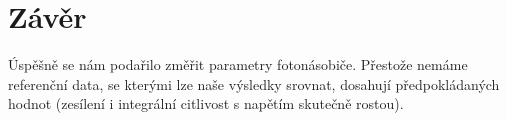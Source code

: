 \documentclass[czech,11pt,a4paper]{article}
\begin{document}
\begin{multicols}{2}
\begin{figure}[H]
		\end{figure}
		
		
		\section{Závěr}
		Úspěšně se nám podařilo změřit parametry fotonásobiče. Přestože nemáme referenční data, se kterými lze naše výsledky srovnat, dosahují předpokládaných hodnot (zesílení i integrální citlivost s napětím skutečně rostou). 
	\end{multicols}
\printbibliography
			
		
		
\end{document}
